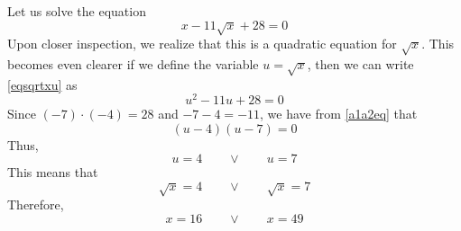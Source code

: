 



	
 \label{Bytvar}
Let us solve the equation 
\begin{equation}\label{eqsqrtxu}
	x-11\sqrt{x}+28=0
\end{equation}
Upon closer inspection, we realize that this is a quadratic equation for $ \sqrt{x} $. This becomes even clearer if we define the variable $ u=\sqrt{x} $, then we can write \eqref{eqsqrtxu} as
\[ u^2-11u+28=0 \]
Since $ (-7)\cdot(-4)=28 $ and $ -7-4=-11 $, we have from \eqref{a1a2eq} that
\[ (u-4)(u-7)=0 \]
Thus,
\[ u=4 \qquad \vee \qquad u=7 \]
This means that
\[ \sqrt{x}=4 \qquad \vee \qquad \sqrt{x}=7 \]
Therefore,
\[ x=16 \qquad \vee \qquad x=49 \]


